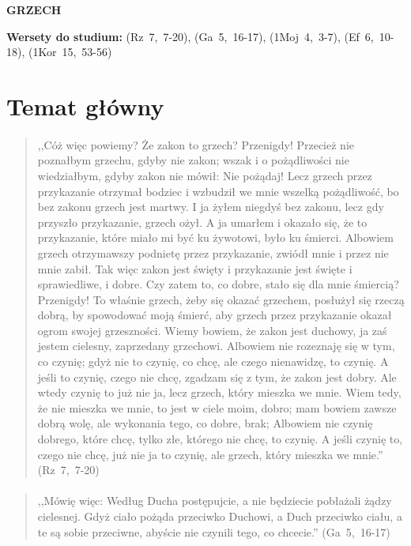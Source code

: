 \documentclass[10pt,a4paper,oneside]{article}
\begin{document}
\centerline{\textbf{\MakeUppercase{Grzech}}}
\begin{center}
\textbf{Wersety do studium:} \mbox{(Rz 7, 7-20)}, \mbox{(Ga 5, 16-17)}, \mbox{(1Moj 4, 3-7)}, \mbox{(Ef 6, 10-18)}, \mbox{(1Kor 15, 53-56)}
\end{center}
\section{Temat główny}
\paragraph{}
\begin{quote}
,,Cóż więc powiemy? Że zakon to grzech? Przenigdy! Przecież nie poznałbym grzechu, gdyby nie zakon; wszak i o pożądliwości nie wiedziałbym, gdyby zakon nie mówił: Nie pożądaj! Lecz grzech przez przykazanie otrzymał bodziec i wzbudził we mnie wszelką pożądliwość, bo bez zakonu grzech jest martwy. I ja żyłem niegdyś bez zakonu, lecz gdy przyszło przykazanie, grzech ożył. A ja umarłem i okazało się, że to przykazanie, które miało mi być ku żywotowi, było ku śmierci. Albowiem grzech otrzymawszy podnietę przez przykazanie, zwiódł mnie i przez nie mnie zabił. Tak więc zakon jest święty i przykazanie jest święte i sprawiedliwe, i dobre. Czy zatem to, co dobre, stało się dla mnie śmiercią? Przenigdy! To właśnie grzech, żeby się okazać grzechem, posłużył się rzeczą dobrą, by spowodować moją śmierć, aby grzech przez przykazanie okazał ogrom swojej grzeszności. Wiemy bowiem, że zakon jest duchowy, ja zaś jestem cielesny, zaprzedany grzechowi. Albowiem nie rozeznaję się w tym, co czynię; gdyż nie to czynię, co chcę, ale czego nienawidzę, to czynię. A jeśli to czynię, czego nie chcę, zgadzam się z tym, że zakon jest dobry. Ale wtedy czynię to już nie ja, lecz grzech, który mieszka we mnie. Wiem tedy, że nie mieszka we mnie, to jest w ciele moim, dobro; mam bowiem zawsze dobrą wolę, ale wykonania tego, co dobre, brak; Albowiem nie czynię dobrego, które chcę, tylko złe, którego nie chcę, to czynię. A jeśli czynię to, czego nie chcę, już nie ja to czynię, ale grzech, który mieszka we mnie.'' \mbox{(Rz 7, 7-20)}
\end{quote}
\paragraph{}
\begin{quote}
,,Mówię więc: Według Ducha postępujcie, a nie będziecie pobłażali żądzy cielesnej. Gdyż ciało pożąda przeciwko Duchowi, a Duch przeciwko ciału, a te są sobie przeciwne, abyście nie czynili tego, co chcecie.'' \mbox{(Ga 5, 16-17)}
\end{quote}
\end{document}
